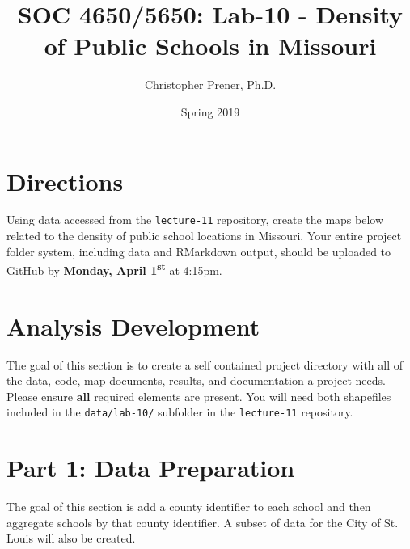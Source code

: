 \documentclass{tufte-handout}
\title{SOC 4650/5650: Lab-10 - Density of Public Schools in Missouri}
\author{Christopher Prener, Ph.D.}
\date{Spring 2019}
\begin{document}

\maketitle %


\vspace{5mm}
\section{Directions}
Using data accessed from the \texttt{lecture-11} repository, create the maps below related to the density of public school locations in Missouri. Your entire project folder system, including data and RMarkdown output, should be uploaded to GitHub by \textbf{Monday, April 1\textsuperscript{st}} at 4:15pm.

\vspace{5mm}
\section{Analysis Development}
The goal of this section is to create a self contained project directory with all of the data, code, map documents, results, and documentation a project needs. Please ensure \textbf{all} required elements are present. You will need both shapefiles included in the \texttt{data/lab-10/} subfolder in the \texttt{lecture-11} repository.

\vspace{5mm}
\section{Part 1: Data Preparation}
The goal of this section is add a county identifier to each school and then aggregate schools by that county identifier. A subset of data for the City of St. Louis will also be created.
\end{document}
